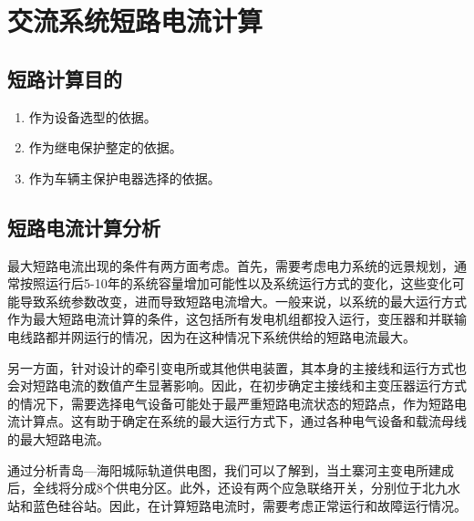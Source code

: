 \chapter{交流系统短路电流计算}
\section{短路计算目的}
\begin{enumerate}
	\item 作为设备选型的依据。  
	\item 作为继电保护整定的依据。 
	\item 作为车辆主保护电器选择的依据。
\end{enumerate}
\section{短路电流计算分析}
最大短路电流出现的条件有两方面考虑。首先，需要考虑电力系统的远景规划，通常按照运行后5-10年的系统容量增加可能性以及系统运行方式的变化，这些变化可能导致系统参数改变，进而导致短路电流增大。一般来说，以系统的最大运行方式作为最大短路电流计算的条件，这包括所有发电机组都投入运行，变压器和并联输电线路都并网运行的情况，因为在这种情况下系统供给的短路电流最大。


另一方面，针对设计的牵引变电所或其他供电装置，其本身的主接线和运行方式也会对短路电流的数值产生显著影响。因此，在初步确定主接线和主变压器运行方式的情况下，需要选择电气设备可能处于最严重短路电流状态的短路点，作为短路电流计算点。这有助于确定在系统的最大运行方式下，通过各种电气设备和载流母线的最大短路电流。


通过分析青岛—海阳城际轨道供电图，我们可以了解到，当土寨河主变电所建成后，全线将分成8个供电分区。此外，还设有两个应急联络开关，分别位于北九水站和蓝色硅谷站。因此，在计算短路电流时，需要考虑正常运行和故障运行情况。

